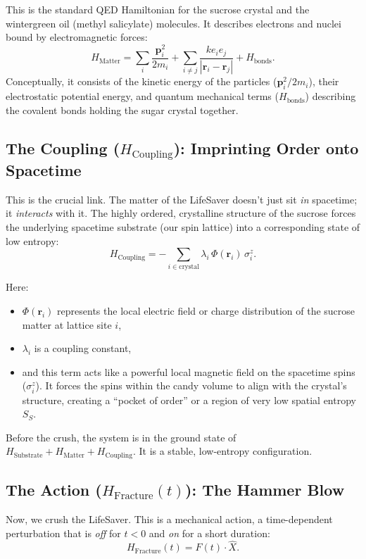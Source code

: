 \documentclass[12pt, a4paper]{article}
\begin{document}
This is the standard QED Hamiltonian for the sucrose crystal and the wintergreen oil (methyl salicylate) molecules. It describes electrons and nuclei bound by electromagnetic forces:
\[
H_{\mathrm{Matter}} = \sum_i \frac{\mathbf{p}_i^2}{2m_i} + \sum_{i \neq j} \frac{k e_i e_j}{| \mathbf{r}_i - \mathbf{r}_j |} + H_{\mathrm{bonds}}.
\]
Conceptually, it consists of the kinetic energy of the particles ($\mathbf{p}_i^2/2m_i$), their electrostatic potential energy, and quantum mechanical terms ($H_{\mathrm{bonds}}$) describing the covalent bonds holding the sugar crystal together.

\subsection*{The Coupling ($H_{\mathrm{Coupling}}$): Imprinting Order onto Spacetime}

This is the crucial link. The matter of the LifeSaver doesn't just sit \emph{in} spacetime; it \emph{interacts} with it. The highly ordered, crystalline structure of the sucrose forces the underlying spacetime substrate (our spin lattice) into a corresponding state of low entropy:
\[
H_{\mathrm{Coupling}} = - \sum_{i \in \mathrm{crystal}} \lambda_i \, \Phi(\mathbf{r}_i) \, \sigma_i^z.
\]

Here:
\begin{itemize}
    \item $\Phi(\mathbf{r}_i)$ represents the local electric field or charge distribution of the sucrose matter at lattice site $i$,
    \item $\lambda_i$ is a coupling constant,
    \item and this term acts like a powerful local magnetic field on the spacetime spins ($\sigma_i^z$). It forces the spins within the candy volume to align with the crystal's structure, creating a “pocket of order” or a region of very low spatial entropy $S_S$.
\end{itemize}

Before the crush, the system is in the ground state of $H_{\mathrm{Substrate}} + H_{\mathrm{Matter}} + H_{\mathrm{Coupling}}$. It is a stable, low-entropy configuration.

\subsection{The Action ($H_{\mathrm{Fracture}}(t)$): The Hammer Blow}

Now, we crush the LifeSaver. This is a mechanical action, a time-dependent perturbation that is \emph{off} for $t<0$ and \emph{on} for a short duration:
\[
H_{\mathrm{Fracture}}(t) = F(t) \cdot \hat{X}.
\]
\end{document}
